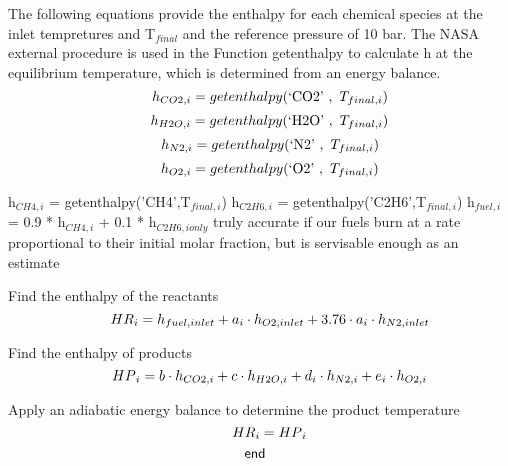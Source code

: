 \documentclass[10pt,fleqn]{article}
\newcommand{\F}[1]{\mbox{$#1$}}
\newcommand{\K}[1]{\mbox{\sf#1\ \ \mit}}
\newcommand{\SC}[1]{\mbox{`#1'}\  }
\newcommand{\V}[1]{\mbox{$ #1 $}}
\newcommand{\I}{\mbox{\hspace{0.20in}}}
\begin{document}
\vspace{0.04in}
\noindent
\rm The following equations provide the enthalpy for each chemical species at the inlet tempretures and T$_{final}$ and the reference pressure of 10 bar. The NASA external procedure is used in the Function 	getenthalpy to calculate h at the equilibrium temperature, which is determined from an energy balance.
\begin{equation}
\I \label{EES Eqn:19}
h_{CO2,i} = \F{getenthalpy}{ \left( \SC{CO2},\ T_{final,i} \right) } 
\end{equation}
\begin{equation}
\I \label{EES Eqn:20}
h_{H2O,i} = \F{getenthalpy}{ \left( \SC{H2O},\ T_{final,i} \right) } 
\end{equation}
\begin{equation}
\I \label{EES Eqn:21}
h_{N2,i} = \F{getenthalpy}{ \left( \SC{N2},\ T_{final,i} \right) } 
\end{equation}
\begin{equation}
\I \label{EES Eqn:22}
h_{O2,i} = \F{getenthalpy}{ \left( \SC{O2},\ T_{final,i} \right) } 
\end{equation}

\vspace{0.04in}
\noindent
\rm h$_{CH4,i}$ = getenthalpy('CH4',T$_{final,i}$)\newline
	h$_{C2H6,i}$ = getenthalpy('C2H6',T$_{final,i}$)\newline
	h$_{fuel,i}$ = 0.9 * h$_{CH4,i}$ + 0.1 * h$_{C2H6,i	only}$ truly accurate if our fuels burn at a rate proportional to their initial molar fraction, but is servisable enough as an estimate

\vspace{0.04in}
\noindent
\rm Find the enthalpy of the reactants
\begin{equation}
\I \label{EES Eqn:23}
\V{HR} _{i} =  h_{fuel,inlet} + a_{i} \cdot  h_{O2,inlet} + 3.76 \cdot  a_{i} \cdot  h_{N2,inlet} 
\end{equation}

\vspace{0.04in}
\noindent
\rm Find the enthalpy of products
\begin{equation}
\I \label{EES Eqn:24}
\V{HP} _{i} = b \cdot  h_{CO2,i} + c \cdot  h_{H2O,i} + d_{i} \cdot  h_{N2,i} + e_{i} \cdot  h_{O2,i} 
\end{equation}

\vspace{0.04in}
\noindent
\rm Apply an adiabatic energy balance to determine the product temperature
\begin{equation}
\I \label{EES Eqn:25}
\V{HR} _{i} = \V{HP} _{i} 
\end{equation}
\begin{equation}
\label{EES Eqn:26}
\K{end} 
\end{equation}
\end{document}
